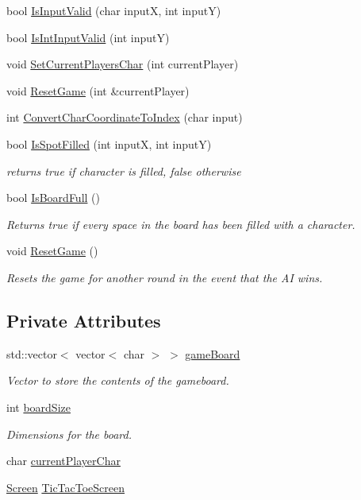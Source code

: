 \begin{DoxyCompactItemize}
\item 
bool \hyperlink{classTicTacToe_a6c8bc2be4b6fc3f462905252c70b5183}{Is\-Input\-Valid} (char input\-X, int input\-Y)
\item 
bool \hyperlink{classTicTacToe_a5182bf8f6a082e22e522b31bdd179df7}{Is\-Int\-Input\-Valid} (int input\-Y)
\item 
void \hyperlink{classTicTacToe_a3c05c5ac2c16a02a6a3c3b2021fdde74}{Set\-Current\-Players\-Char} (int current\-Player)
\item 
void \hyperlink{classTicTacToe_a740fc2c6b0526442ead17835c473f93e}{Reset\-Game} (int \&current\-Player)
\item 
int \hyperlink{classTicTacToe_a40ab96fced3061640200f5e7b83e0415}{Convert\-Char\-Coordinate\-To\-Index} (char input)
\item 
bool \hyperlink{classTicTacToe_a7b1ba09a855c9a3f71e3e06b3e76a992}{Is\-Spot\-Filled} (int input\-X, int input\-Y)
\begin{DoxyCompactList}\small\item\em returns true if character is filled, false otherwise \end{DoxyCompactList}\item 
bool \hyperlink{classTicTacToe_a7bb5521e85c2a1d4c61ab405d03a62c5}{Is\-Board\-Full} ()
\begin{DoxyCompactList}\small\item\em Returns true if every space in the board has been filled with a character. \end{DoxyCompactList}\item 
void \hyperlink{classTicTacToe_a36b58f33246558d0b7b34412b641cff6}{Reset\-Game} ()
\begin{DoxyCompactList}\small\item\em Resets the game for another round in the event that the A\-I wins. \end{DoxyCompactList}\end{DoxyCompactItemize}
\subsection*{Private Attributes}
\begin{DoxyCompactItemize}
\item 
std\-::vector$<$ vector$<$ char $>$ $>$ \hyperlink{classTicTacToe_a56cd1b3760908be79d5fa311c2d17761}{game\-Board}
\begin{DoxyCompactList}\small\item\em Vector to store the contents of the gameboard. \end{DoxyCompactList}\item 
int \hyperlink{classTicTacToe_a0aab68285cb8b8f5ce6159ed5cfc8bbd}{board\-Size}
\begin{DoxyCompactList}\small\item\em Dimensions for the board. \end{DoxyCompactList}\item 
char \hyperlink{classTicTacToe_a914627e3dd8100c387e98c4a022b1457}{current\-Player\-Char}
\item 
\hyperlink{classScreen}{Screen} \hyperlink{classTicTacToe_a6749582a8480be3cbae920f8f2cca8ce}{Tic\-Tac\-Toe\-Screen}
\end{DoxyCompactItemize}
